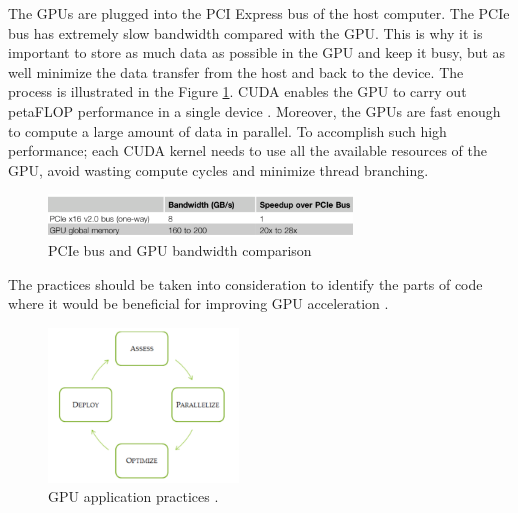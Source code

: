 The GPUs are plugged into the PCI Express bus of the host computer. The PCIe bus has extremely slow bandwidth compared with the GPU. This is why it is important to store as much data as possible in the GPU and keep it busy, but as well minimize the data transfer from the host and back to the device. The process is illustrated in the Figure \ref{fig:PCI}. CUDA enables the GPU to carry out petaFLOP performance in a single device \cite{cook}. Moreover, the GPUs are fast enough to compute a large amount of data in parallel. To accomplish such high performance; each CUDA kernel needs to use all the available resources of the GPU, avoid wasting compute cycles and minimize thread branching.

\begin{figure}[htbp]
	\centering
		\includegraphics[width=0.72\textwidth]{Figures/PCI.png}
		\smallskip
	\caption[PCIe Bandwidth]{PCIe bus and GPU bandwidth comparison \cite{cook}}
	\label{fig:PCI}
\end{figure}

The practices should be taken into consideration to identify the parts of code where it would be beneficial for improving GPU acceleration \cite{practices}.

\begin{figure}[htbp]
	\centering
		\includegraphics[width=0.45\textwidth]{Figures/apod.png}
		\smallskip
	\caption[GPU application practices]{GPU application practices \cite{practices}.}
	\label{fig:apod}
\end{figure}

